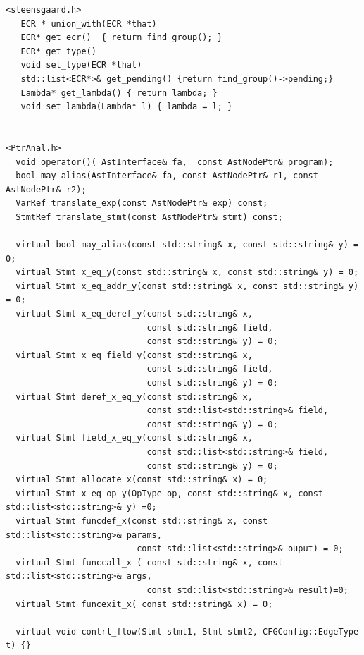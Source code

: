 \begin{enumerate}
\begin{enumerate}
\begin{lstlisting}
<steensgaard.h>
   ECR * union_with(ECR *that) 
   ECR* get_ecr()  { return find_group(); }
   ECR* get_type() 
   void set_type(ECR *that) 
   std::list<ECR*>& get_pending() {return find_group()->pending;}
   Lambda* get_lambda() { return lambda; }
   void set_lambda(Lambda* l) { lambda = l; } 


<PtrAnal.h>
  void operator()( AstInterface& fa,  const AstNodePtr& program);
  bool may_alias(AstInterface& fa, const AstNodePtr& r1, const AstNodePtr& r2);
  VarRef translate_exp(const AstNodePtr& exp) const;
  StmtRef translate_stmt(const AstNodePtr& stmt) const;

  virtual bool may_alias(const std::string& x, const std::string& y) = 0;
  virtual Stmt x_eq_y(const std::string& x, const std::string& y) = 0; 
  virtual Stmt x_eq_addr_y(const std::string& x, const std::string& y) = 0; 
  virtual Stmt x_eq_deref_y(const std::string& x, 
                            const std::string& field,
                            const std::string& y) = 0;
  virtual Stmt x_eq_field_y(const std::string& x, 
                            const std::string& field,
                            const std::string& y) = 0;
  virtual Stmt deref_x_eq_y(const std::string& x, 
                            const std::list<std::string>& field,
                            const std::string& y) = 0;
  virtual Stmt field_x_eq_y(const std::string& x, 
                            const std::list<std::string>& field,
                            const std::string& y) = 0;
  virtual Stmt allocate_x(const std::string& x) = 0;
  virtual Stmt x_eq_op_y(OpType op, const std::string& x, const std::list<std::string>& y) =0;
  virtual Stmt funcdef_x(const std::string& x, const std::list<std::string>& params,
                          const std::list<std::string>& ouput) = 0;
  virtual Stmt funccall_x ( const std::string& x, const std::list<std::string>& args,
                            const std::list<std::string>& result)=0; 
  virtual Stmt funcexit_x( const std::string& x) = 0;

  virtual void contrl_flow(Stmt stmt1, Stmt stmt2, CFGConfig::EdgeType t) {}

      \end{lstlisting}



\end{enumerate}
\end{enumerate}
